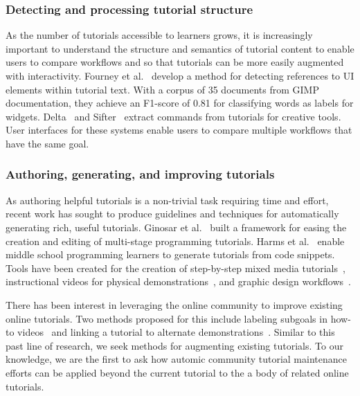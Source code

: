 \subsubsection{Detecting and processing tutorial structure}

As the number of tutorials accessible to learners grows, it is increasingly important to understand the structure and semantics of tutorial content to enable users to compare workflows and so that tutorials can be more easily augmented with interactivity.
Fourney et al.~\cite{fourney_then_2012} develop a method for detecting references to UI elements within tutorial text.
With a corpus of 35 documents from GIMP documentation, they achieve an F1-score of 0.81 for classifying words as labels for widgets.
Delta~\cite{kong_delta_2012} and Sifter~\cite{pavel_browsing_2013} extract commands from tutorials for creative tools.
User interfaces for these systems enable users to compare multiple workflows that have the same goal.

\subsubsection{Authoring, generating, and improving tutorials}

As authoring helpful tutorials is a non-trivial task requiring time and effort, recent work has sought to produce guidelines and techniques for automatically generating rich, useful tutorials.
Ginosar et al.~\cite{ginosar_authoring_2013} built a framework for easing the creation and editing of multi-stage programming tutorials.
Harms et al.~\cite{harms_automatically_2013} enable middle school programming learners to generate tutorials from code snippets.
Tools have been created for the creation of step-by-step mixed media tutorials~\cite{chi_mixt_2012}, instructional videos for physical demonstrations~\cite{chi_democut_2013}, and graphic design workflows~\cite{grossman_chronicle_2010}.

There has been interest in leveraging the online community to improve existing online tutorials.
Two methods proposed for this include labeling subgoals in how-to videos~\cite{kim_learnersourcing_2013} and linking a tutorial to alternate demonstrations~\cite{lafreniere_community_2013}.
Similar to this past line of research, we seek methods for augmenting existing tutorials.
To our knowledge, we are the first to ask how automic community tutorial maintenance efforts can be applied beyond the current tutorial to the a body of related online tutorials.
